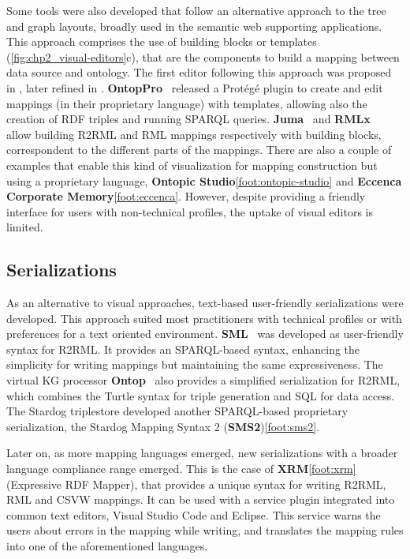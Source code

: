 
Some tools were also developed that follow an alternative approach to the tree and graph layouts, broadly used in the semantic web supporting applications. 
This approach comprises the use of building blocks or templates (\cref{fig:chp2_visual-editors}c), that are the components to build a mapping between data source and ontology. 
The first editor following this approach was proposed in \cite{sengupta2013editing}, later refined in \cite{pinkel2014best}. 
\textbf{OntopPro}~\parencite{calvanese2017ontop} released a Protégé plugin to create and edit mappings (in their proprietary language) with templates, allowing also the creation of RDF triples and running SPARQL queries. 
\textbf{Juma}~\parencite{junior2017juma} and \textbf{RMLx}~\parencite{aryan2017rmlx} allow building R2RML and RML mappings respectively with building blocks, correspondent to the different parts of the mappings. 
There are also a couple of examples that enable this kind of visualization for mapping construction but using a proprietary language, \textbf{Ontopic Studio}\cref{foot:ontopic-studio} and \textbf{Eccenca Corporate Memory}\cref{foot:eccenca}. 
However, despite providing a friendly interface for users with non-technical profiles, the uptake of visual editors is limited.  

\subsection{Serializations}
\label{sec:chp2_serializations}

As an alternative to visual approaches, text-based user-friendly serializations were developed. This approach suited most practitioners with technical profiles or with preferences for a text oriented environment. 
\textbf{SML}~\parencite{Stadler2015sml} was developed as user-friendly syntax for R2RML. It provides an SPARQL-based syntax, enhancing the simplicity for writing mappings but maintaining the same expressiveness. 
The virtual KG processor \textbf{Ontop}~\parencite{calvanese2017ontop} also provides a simplified serialization for R2RML, which combines the Turtle syntax for triple generation and SQL for data access. 
The Stardog triplestore developed another SPARQL-based proprietary serialization, the Stardog Mapping Syntax 2 (\textbf{SMS2})\cref{foot:sms2}. 

Later on, as more mapping languages emerged, new serializations with a broader language compliance range emerged. This is the case of \textbf{XRM}\cref{foot:xrm} (Expressive RDF Mapper), that provides a unique syntax for writing R2RML, RML and CSVW mappings. It can be used with a service plugin integrated into common text editors, Visual Studio Code and Eclipse. This service warns the users about errors in the mapping while writing, and translates the mapping rules into one of the aforementioned languages. 


